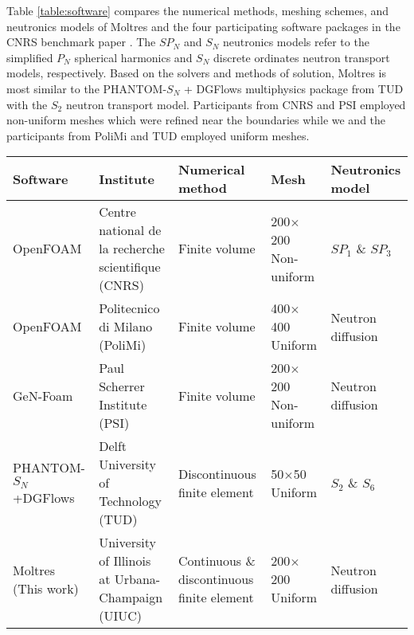 Table \ref{table:software} compares the numerical methods, meshing schemes, and
neutronics models of Moltres and the four participating software packages in
the CNRS benchmark paper \cite{tiberga_results_2020}. The $SP_N$ and
$S_N$ neutronics models refer to the simplified $P_N$ spherical harmonics and
$S_N$ discrete ordinates neutron transport models, respectively. Based on the
solvers and methods of solution, Moltres is most similar to the
PHANTOM-$S_N$ + DGFlows \cite{tiberga_discontinuous_2019} multiphysics package
from \gls{TUD} with the $S_2$ neutron transport model. Participants from
\gls{CNRS} and \gls{PSI}
employed non-uniform meshes which were refined near the boundaries while we and
the participants from \gls{PoliMi} and \gls{TUD} employed uniform meshes.

\FloatBarrier

\begin{landscape}
\begin{table*}[p]
    \caption{List of software packages and their corresponding model
    specifications for the CNRS Benchmark simulations
    \cite{tiberga_results_2020}.}
    \centering
    \begin{tabular}{p{4.2cm} p{7cm} p{3.3cm} p{2cm} p{2.7cm}}
        \toprule
        Software & Institute & Numerical method & Mesh & Neutronics model \\
        \midrule
        OpenFOAM & Centre national de la recherche scientifique (CNRS) & Finite volume & 200$\times$200 \newline Non-uniform & $SP_1$ \& $SP_3$ \\
        OpenFOAM & Politecnico di Milano (PoliMi) & Finite volume & 400$\times$400 \newline Uniform & Neutron diffusion \\
        GeN-Foam & Paul Scherrer Institute (PSI) & Finite volume & 200$\times$200 \newline Non-uniform & Neutron diffusion \\
        PHANTOM-$S_N$+DGFlows & Delft University of Technology (TUD) & Discontinuous finite \newline element & 50$\times$50 \newline Uniform & $S_2$ \& $S_6$ \\
        Moltres (This work) & University of Illinois at Urbana-Champaign (UIUC) & Continuous \& discontinuous finite element & 200$\times$200 \newline Uniform & Neutron diffusion \\
        \bottomrule
    \end{tabular}
    \label{table:software}
\end{table*}
\end{landscape}

\FloatBarrier